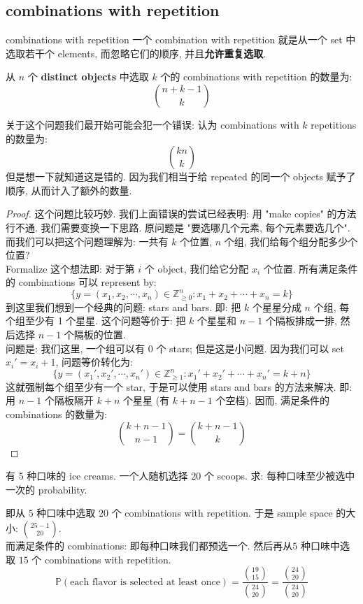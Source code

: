 \subsection{combinations with repetition}
\begin{definition}{combinations with repetition}
一个 combination with repetition 就是从一个 set 中选取若干个 elements, 而忽略它们的顺序, 并且\textbf{允许重复选取}.
\end{definition}
\begin{proposition}
    从 $n$ 个 \textbf{distinct objects} 中选取 $k$ 个的 combinations with repetition 的数量为: \[
    \binom{n+k-1}{k}
    \]
\end{proposition}
\begin{remark}
    关于这个问题我们最开始可能会犯一个错误: 认为 combinations with $k$ repetitions 的数量为: \[
    \binom{kn}{k}
    \]
    但是想一下就知道这是错的. 因为我们相当于给 repeated 的同一个 objects 赋予了顺序, 从而计入了额外的数量.
\end{remark}
\begin{proof}
    这个问题比较巧妙. 我们上面错误的尝试已经表明: 用 "make copies" 的方法行不通. 
    我们需要变换一下思路. 原问题是 "要选哪几个元素, 每个元素要选几个".
    而我们可以把这个问题理解为: 一共有 $k$ 个位置, $n$ 个组, 我们给每个组分配多少个位置?\\
    Formalize 这个想法即: 对于第 $i$ 个 object, 我们给它分配 $x_i$ 个位置. 所有满足条件的 combinations 可以 represent by:
    \[
    \{ y = (x_1, x_2, \cdots, x_n) \in \mathbb{Z}_{\geq 0}^n : x_1 + x_2 + \cdots + x_n = k \}
    \]
    到这里我们想到一个经典的问题: stars and bars. 即: 把 $k$ 个星星分成 $n$ 个组, 每个组至少有 1 个星星. 这个问题等价于: 把 $k$ 个星星和 $n-1$ 个隔板排成一排, 然后选择 $n-1$ 个隔板的位置.\\
    问题是: 我们这里, 一个组可以有 $0$ 个 stars; 但是这是小问题. 因为我们可以 set $x_i' = x_i + 1$, 问题等价转化为:
    \[
    \{ y = (x_1', x_2', \cdots, x_n') \in \mathbb{Z}_{\geq 1}^n : x_1' + x_2' + \cdots + x_n' = k + n \}
    \]
    这就强制每个组至少有一个 star, 于是可以使用 stars and bars 的方法来解决. 即: 用 $n-1$ 个隔板隔开 $k+n$ 个星星 (有 $k+n-1$ 个空档). 
    因而, 满足条件的 combinations 的数量为: \[
    \binom{k+n-1}{n-1} = \binom{k+n-1}{k}
    \]
\end{proof}
\begin{example}
有 5 种口味的 ice creams. 一个人随机选择 20 个 scoops. 求: 每种口味至少被选中一次的 probability.
\begin{solution}
即从 $5$ 种口味中选取 $20$ 个 combinations with repetition. 于是 sample space 的大小: $\binom{25-1}{20}$.\\
而满足条件的 combinations: 即每种口味我们都预选一个. 然后再从$5$ 种口味中选取 $15$ 个 combinations with repetition. 
\[
\mathbb{P}(\text{each flavor is selected at least once}) = \frac{\binom{19}{15}}{\binom{24}{20}} = \frac{\binom{24}{20}}{\binom{24}{20}}
\]
\end{solution}
\end{example}



